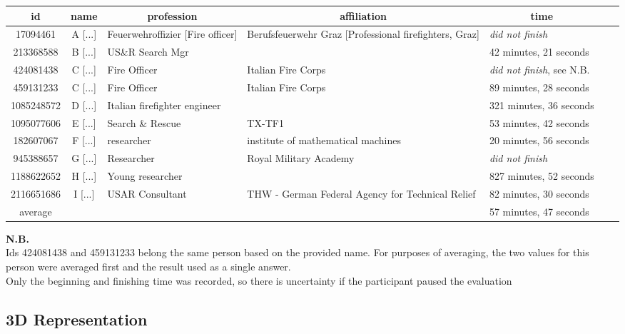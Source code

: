 \documentclass[8pt]{article}
\begin{document}
\begin{longtable}{|c|c|l|p{8cm}|l|l|l|} 
\hline
\multicolumn{1}{|c|}{\textbf{id}} &
\multicolumn{1}{|c|}{\textbf{name}} &
\multicolumn{1}{|c|}{\textbf{profession}} &
\multicolumn{1}{|c|}{\textbf{affiliation}} &
\multicolumn{1}{|c|}{\textbf{time}} \\
\hline \hline 
\endfirsthead 
17094461 & A [...] & Feuerwehroffizier [Fire officer] & Berufsfeuerwehr Graz [Professional firefighters, Graz] & \textit{did not finish} \\ \hline 
213368588 & B [...] & US\&R Search Mgr &  & 42 minutes, 21 seconds \\ \hline 
424081438 & C [...] & Fire Officer & Italian Fire Corps & \textit{did not finish}, see N.B. \\ \hline 
459131233 & C [...] & Fire Officer & Italian Fire Corps & 89 minutes, 28 seconds \\ \hline 
1085248572 & D [...] & Italian firefighter engineer &  & 321 minutes, 36 seconds \\ \hline 
1095077606 & E [...] & Search \& Rescue & TX-TF1 & 53 minutes, 42 seconds \\ \hline 
182607067 & F [...] & researcher & institute of mathematical machines & 20 minutes, 56 seconds \\ \hline 
945388657 & G [...] & Researcher & Royal Military Academy & \textit{did not finish} \\ \hline 
1188622652 & H [...] & Young researcher &  & 827 minutes, 52 seconds \\ \hline 
2116651686 & I [...]  & USAR Consultant & THW - German Federal Agency for Technical Relief & 82 minutes, 30 seconds \\ \hline \hline
average & & & & 57 minutes, 47 seconds \\ \hline
\end{longtable}
 
\noindent \textbf{N.B.} \\
Ids 424081438 and 459131233 belong the same person based on the provided name. For purposes of averaging, the two values for this person were averaged first and the result used as a single answer. \\
Only the beginning and finishing time was recorded, so there is uncertainty if the participant paused the evaluation

\newpage

%
%
%
%
\subsection*{3D Representation}
\end{document}
